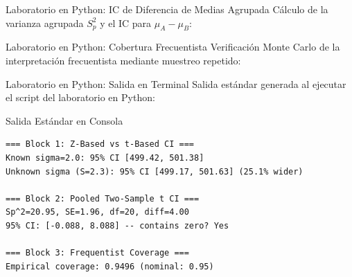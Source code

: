 \documentclass[10pt, aspectratio=169]{beamer}
\begin{document}
\begin{frame}[fragile]{Laboratorio en Python: IC de Diferencia de Medias Agrupada}
  \scriptsize
  Cálculo de la varianza agrupada $S_p^2$ y el IC para $\mu_A-\mu_B$:
  {
  }
\end{frame}

\begin{frame}[fragile]{Laboratorio en Python: Cobertura Frecuentista}
  \scriptsize
  Verificación Monte Carlo de la interpretación frecuentista mediante muestreo repetido:
  {
  }
\end{frame}

\begin{frame}[fragile]{Laboratorio en Python: Salida en Terminal}
  \scriptsize
  Salida estándar generada al ejecutar el script del laboratorio en Python:
  \vspace{0.02cm}
  \begin{block}{Salida Estándar en Consola}
    \fontsize{4pt}{5pt}\selectfont
    \begin{verbatim}
=== Block 1: Z-Based vs t-Based CI ===
Known sigma=2.0: 95% CI [499.42, 501.38]
Unknown sigma (S=2.3): 95% CI [499.17, 501.63] (25.1% wider)

=== Block 2: Pooled Two-Sample t CI ===
Sp^2=20.95, SE=1.96, df=20, diff=4.00
95% CI: [-0.088, 8.088] -- contains zero? Yes

=== Block 3: Frequentist Coverage ===
Empirical coverage: 0.9496 (nominal: 0.95)
    \end{verbatim}
  \end{block}
\end{frame}
\end{document}
